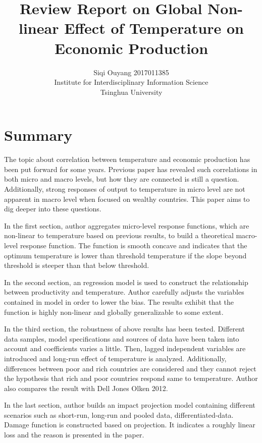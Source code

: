 \documentclass[letterpaper]{article}
\title{Review Report on Global Non-linear Effect of Temperature on Economic Production}
\author{Siqi Ouyang 2017011385 \\ Institute for Interdisciplinary Information Science \\ Tsinghua University}
\begin{document}
\nocopyright
\maketitle


\section{Summary}

The topic about correlation between temperature and economic production has been put forward for some years. Previous paper has revealed such correlations in both micro and macro levels, but how they are connected is still a question. Additionally, strong responses of output to temperature in micro level are not apparent in macro level when focused on wealthy countries. This paper aims to dig deeper into these questions.

In the first section, author aggregates micro-level response functions, which are non-linear to temperature based on previous results, to build a theoretical macro-level response function. The function is smooth concave and indicates that the optimum temperature is lower than threshold temperature if the slope beyond threshold is steeper than that below threshold.

In the second section, an regression model is used to construct the relationship between productivity and temperature. Author carefully adjusts the variables contained in model in order to lower the bias. The results exhibit that the function is highly non-linear and globally generalizable to some extent.

In the third section, the robustness of above results has been tested. Different data samples, model specifications and sources of data have been taken into account and coefficients varies a little. Then, lagged independent variables are introduced and long-run effect of temperature is analyzed. Additionally, differences between poor and rich countries are considered and they cannot reject the hypothesis that rich and poor countries respond same to temperature. Author also compares the result with Dell Jones Olken 2012.

In the last section, author builds an impact projection model containing different scenarios such as short-run, long-run and pooled data, differentiated-data. Damage function is constructed based on projection. It indicates a roughly linear loss and the reason is presented in the paper. 
\end{document}
